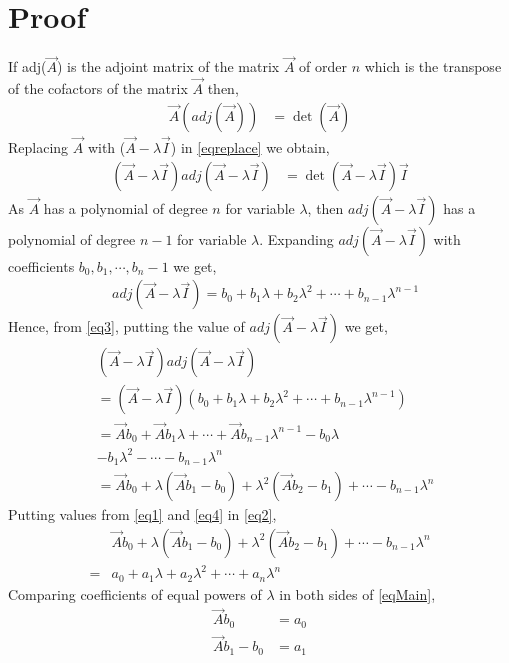 \documentclass[journal,12pt,twocolumn]{IEEEtran}
\begin{document}
\section{Proof}
If adj($\vec{A}$) is the adjoint matrix of the matrix $\vec{A}$ of order $n$ which is the transpose of the cofactors of the matrix $\vec{A}$ then, 
\begin{align} 
\vec{A}(adj(\vec{A})) &= \det(\vec{A})\label{eqreplace}
\end{align}
Replacing $\vec{A}$ with ($\vec{A}-\lambda\vec{I}$) in \eqref{eqreplace} we obtain,
\begin{align}
(\vec{A}-\lambda\vec{I})adj(\vec{A}-\lambda\vec{I}) &= \det(\vec{A}-\lambda\vec{I})\vec{I}\label{eq3}
\end{align}
As $\vec{A}$ has a polynomial of degree $n$ for variable $\lambda$, then
$adj(\vec{A}-\lambda\vec{I})$ has a polynomial of degree $n-1$ for variable $\lambda$. Expanding $adj(\vec{A}-\lambda\vec{I})$ with coefficients $b_0,b_1,\cdots,b_n-1$ we get,
\begin{align} 
& adj(\vec{A}-\lambda\vec{I}) = b_0 + b_1\lambda + b_2\lambda^{2} +  \cdots+b_{n-1}\lambda^{n-1}
\end{align}
Hence, from \eqref{eq3}, putting the value of $adj(\vec{A}-\lambda\vec{I})$ we get,
\begin{align}
& (\vec{A}-\lambda\vec{I}) adj(\vec{A}-\lambda\vec{I}) \\&= (\vec{A}-\lambda\vec{I})(b_0 + b_1\lambda + b_2\lambda^{2} +  \cdots+b_{n-1}\lambda^{n-1})\\
&= \vec{A}b_0 + \vec{A}b_1\lambda +\cdots+ \vec{A}b_{n-1}\lambda^{n-1}- b_0\lambda\\ 
&    - b_1\lambda^{2}-\cdots - b_{n-1}\lambda^{n}\\
&=\vec{A}b_0 + \lambda(\vec{A}b_1 - b_0) + \lambda^{2}(\vec{A}b_2 - b_1) + \cdots - b_{n-1}\lambda^{n}  \label{eq4}
\end{align}
Putting values from \eqref{eq1} and \eqref{eq4}  in \eqref{eq2},
\begin{align} 
&\vec{A}b_0 + \lambda(\vec{A}b_1 - b_0) + \lambda^{2}(\vec{A}b_2 - b_1) + \cdots - b_{n-1}\lambda^{n} \\=
&a_0 + a_1\lambda + a_2\lambda^{2} +  \cdots+a_n\lambda^{n}\label{eqMain}
\end{align}
Comparing coefficients of equal powers of $\lambda$ in both sides of \eqref{eqMain},
\begin{align}
\vec{A}b_0 &= a_0 \label{eqS1}\\
\vec{A}b_1 - b_0 &= a_1 \label{eqS2}
\end{align}
\end{document}
